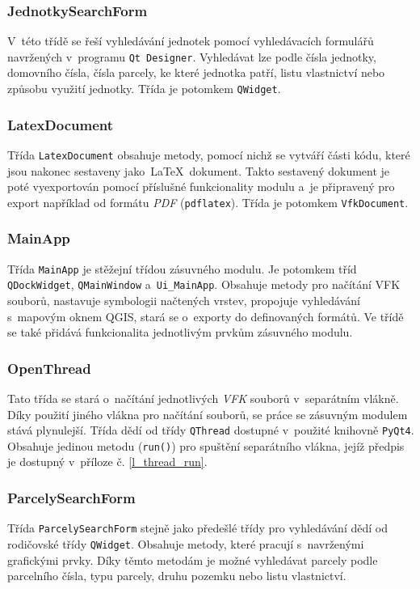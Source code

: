 \documentclass[a4paper,12pt,oneside]{book}
\newcommand{\latex}{\LaTeX}
\begin{document}
\subsubsection{JednotkySearchForm}
V~této třídě se řeší vyhledávání jednotek pomocí vyhledávacích
formulářů navržených v~programu \texttt{Qt Designer}. Vyhledávat lze
podle čísla jednotky, domovního čísla, čísla parcely, ke které
jednotka patří, listu vlastnictví nebo způsobu využití jednotky. Třída
je potomkem \texttt{QWidget}.

\subsubsection{LatexDocument}
Třída \texttt{LatexDocument} obsahuje metody, pomocí nichž se vytváří
části kódu, které jsou nakonec sestaveny jako~\latex~dokument. Takto
sestavený dokument je poté vyexportován pomocí příslušné funkcionality
modulu a~je připravený pro export například od formátu \textit{PDF}
(\texttt{pdflatex}). Třída je potomkem \texttt{VfkDocument}.

\subsubsection{MainApp}
Třída \texttt{MainApp} je stěžejní třídou zásuvného modulu. Je
potomkem tříd \texttt{QDockWidget}, \texttt{QMainWindow}
a~\texttt{Ui\_MainApp}. Obsahuje metody pro načítání VFK souborů,
nastavuje symbologii načtených vrstev, propojuje vyhledávání s~mapovým
oknem QGIS, stará se o~exporty do definovaných formátů. Ve třídě se
také přidává funkcionalita jednotlivým prvkům zásuvného modulu.

\subsubsection{OpenThread}
Tato třída se stará o~načítání jednotlivých \textit{VFK} souborů
v~separátním vlákně. Díky použití jiného vlákna pro načítání souborů,
se práce se zásuvným modulem stává plynulejší. Třída dědí od třídy
\texttt{QThread} dostupné v~použité knihovně \texttt{PyQt4}. Obsahuje
jedinou metodu (\texttt{run()}) pro spuštění separátního vlákna,
jejíž předpis je dostupný v~příloze č. \ref{l_thread_run}.

\subsubsection{ParcelySearchForm}
Třída \texttt{ParcelySearchForm} stejně jako předešlé třídy pro
vyhledávání dědí od rodičovské třídy \texttt{QWidget}. Obsahuje
metody, které pracují s~navrženými grafickými prvky. Díky těmto
metodám je možné vyhledávat parcely podle parcelního čísla, typu
parcely, druhu pozemku nebo listu vlastnictví.
\end{document}
